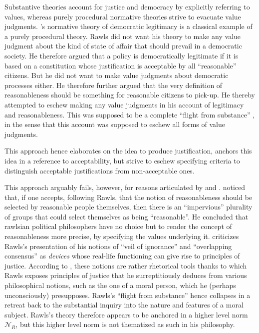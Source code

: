 \documentclass[preprint, french, english, 11pt, authoryear]{elsarticle}%
\begin{document}
Substantive theories account for justice and democracy by explicitly referring to values, whereas purely procedural normative theories strive to evacuate value judgments. 
\cite{rawls_political_2005}'s normative theory of democratic legitimacy is a classical example of a purely procedural theory. 
Rawls did not want his theory to make any value judgment about the kind of state of affair that should prevail in a democratic society. 
He therefore argued that a policy is democratically legitimate if it is based on a constitution whose justification is acceptable by all  “reasonable” citizens. 
But he did not want to make value judgments about democratic processes either. He therefore further argued that the very definition of reasonableness should be something for reasonable citizens to pick-up. 
He thereby attempted to eschew making any value judgments in his account of legitimacy and reasonableness. 
This was supposed to be a complete ``flight from substance'' \citep{estlund_democratic_2009}, in the sense that this account was supposed to eschew all forms of value judgments.

This approach hence elaborates on the idea to produce justification, anchors this idea in a reference to acceptability, but strive to eschew specifying criteria to distinguish acceptable justifications from non-acceptable ones.

This approach arguably fails, however, for reasons articulated by \cite{habermas_reconciliation_1995} and \cite{estlund_democratic_2009}. 
\citet{estlund_democratic_2009} noticed that, if one accepts, following Rawls, that the notion of reasonableness should be selected by reasonable people themselves, then there is an “impervious” plurality of groups that could select themselves as being “reasonable”. 
He concluded that rawlsian political philosophers have no choice but to render the concept of reasonableness more precise, by specifying the values underlying it. 
\cite{habermas_reconciliation_1995} criticizes Rawls's presentation of his notions of “veil of ignorance” and  “overlapping consensus” as \emph{devices} whose real-life functioning can give rise to principles of justice. 
According to \cite{habermas_reconciliation_1995}, these notions are rather rhetorical tools thanks to which Rawls exposes principles of justice that he surreptitiously deduces from various philosophical notions, such as the one of a moral person, which he (perhaps unconsciously) presupposes. 
Rawls's ``flight from substance'' hence collapses in a retreat back to the substantial inquiry into the nature and features of a moral subject.  Rawls's theory therefore appears to be anchored in a higher level norm $\mathscr{N}_R$, but this higher level norm is not thematized as such in his philosophy.
\end{document}
